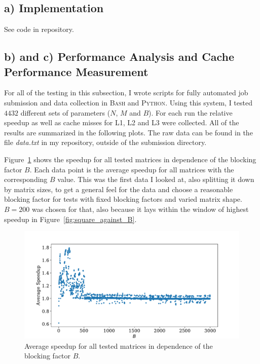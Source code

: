 \documentclass[a4paper, 11pt]{article}
\begin{document}
\subsection*{a) Implementation}
See code in repository.

\subsection*{b) and c) Performance Analysis and Cache Performance Measurement}
For all of the testing in this subsection, I wrote scripts for fully automated
job submission and data collection  in \textsc{Bash} and \textsc{Python}. Using
this system, I tested $4432$ different sets of parameters ($N$, $M$ and $B$).
For each run the relative speedup as well as cache misses for L1, L2 and L3
were collected. All of the results are summarized in the following plots. The
raw data can be found in the file \textit{data.txt} in my repository, outside
of the submission directory.

Figure~\ref{fig:all_runs} shows the speedup for all tested matrices in
dependence of the blocking factor $B$. Each data point is the average speedup
for all matrices with the corresponding $B$ value. This was the first data I
looked at, also splitting it down by matrix sizes, to get a general feel for
the data and choose a reasonable blocking factor for tests with fixed blocking
factors and varied matrix shape. $B = 200$ was chosen for that, also because it
lays within the window of highest speedup in Figure~\ref{fig:square_against_B}.
\begin{figure}
  \centering
  \includegraphics[width=\textwidth]{../plot/speedup_for_all_bs.pdf}
  \caption{Average speedup for all tested matrices in dependence of the blocking factor $B$.}
  \label{fig:all_runs}
\end{figure}
\FloatBarrier
\end{document}
